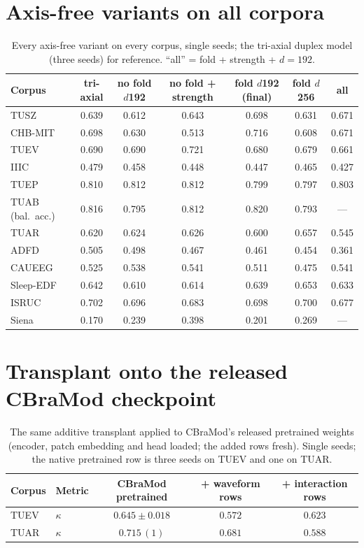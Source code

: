 \section{Axis-free variants on all corpora}
\label{app:variants}

\begin{table}[h]
\centering
\small
\caption{Every axis-free variant on every corpus, single seeds; the
tri-axial duplex model (three seeds) for reference. ``all'' = fold +
strength + $d{=}192$.}
\label{tab:variants-all}
\begin{tabular}{lcccccc}
\toprule
Corpus & tri-axial & no fold $d$192 & no fold + strength & fold $d$192 (final) & fold $d$256 & all \\
\midrule
TUSZ & 0.639 & 0.612 & 0.643 & 0.698 & 0.631 & 0.671 \\
CHB-MIT & 0.698 & 0.630 & 0.513 & 0.716 & 0.608 & 0.671 \\
TUEV & 0.690 & 0.690 & 0.721 & 0.680 & 0.679 & 0.661 \\
IIIC & 0.479 & 0.458 & 0.448 & 0.447 & 0.465 & 0.427 \\
TUEP & 0.810 & 0.812 & 0.812 & 0.799 & 0.797 & 0.803 \\
TUAB (bal.\ acc.) & 0.816 & 0.795 & 0.812 & 0.820 & 0.793 & --- \\
TUAR & 0.620 & 0.624 & 0.626 & 0.600 & 0.657 & 0.545 \\
ADFD & 0.505 & 0.498 & 0.467 & 0.461 & 0.454 & 0.361 \\
CAUEEG & 0.525 & 0.538 & 0.541 & 0.511 & 0.475 & 0.541 \\
Sleep-EDF & 0.642 & 0.610 & 0.614 & 0.639 & 0.653 & 0.633 \\
ISRUC & 0.702 & 0.696 & 0.683 & 0.698 & 0.700 & 0.677 \\
Siena & 0.170 & 0.239 & 0.398 & 0.201 & 0.269 & --- \\
\bottomrule
\end{tabular}
\end{table}

\section{Transplant onto the released CBraMod checkpoint}
\label{app:transplant-pre}

\begin{table}[h]
\centering
\small
\caption{The same additive transplant applied to CBraMod's released
pretrained weights (encoder, patch embedding and head loaded; the added
rows fresh). Single seeds; the native pretrained row is three seeds on
TUEV and one on TUAR.}
\label{tab:transplant-pre}
\begin{tabular}{llccc}
\toprule
Corpus & Metric & CBraMod pretrained & + waveform rows & + interaction rows \\
\midrule
TUEV & $\kappa$ & $\mathbf{0.645 \pm 0.018}$ & $0.572$ & $0.623$ \\
TUAR & $\kappa$ & $\mathbf{0.715}\,(1)$ & $0.681$ & $0.588$ \\
\bottomrule
\end{tabular}
\end{table}
